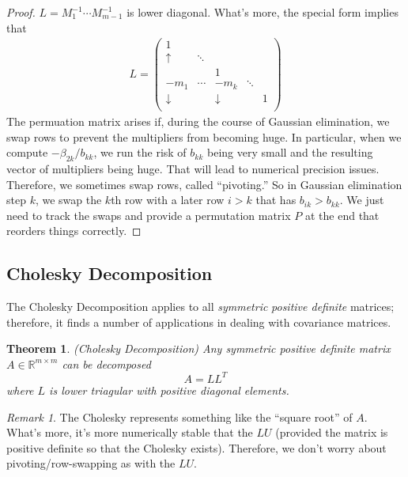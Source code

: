 \documentclass[12pt]{book}
\numberwithin{equation}{section} %
\theoremstyle{plain}
\newtheorem{thm}{Theorem}[section]
\theoremstyle{definition}
\theoremstyle{remark}
\newtheorem*{rmk}{Remark}
\newcommand{\Rmm}{\mathbb{R}^{m\times m}}
\begin{document}
\begin{proof}
$L=M_1^{-1}\cdots M_{m-1}^{-1}$ is lower diagonal. What's more, the
special form implies that
\begin{align*}
  L=
  \begin{pmatrix}
    1 & &\\
    \uparrow& \ddots &\\
     & & 1 \\
    -m_1 & \cdots & -m_k &\ddots \\
    \downarrow & & \downarrow & & 1 \\
  \end{pmatrix}
\end{align*}
The permuation matrix arises if, during the course of Gaussian
elimination, we swap rows to prevent the multipliers from becoming huge.
In particular, when we compute $-\beta_{2k}/b_{kk}$, we run the risk of
$b_{kk}$ being very small and the resulting vector of multipliers being
huge. That will lead to numerical precision issues. Therefore, we
sometimes swap rows, called ``pivoting.'' So in Gaussian elimination
step $k$, we swap the $k$th row with a later row $i>k$ that has
$b_{ik}>b_{kk}$. We just need to track the swaps and provide a
permutation matrix $P$ at the end that reorders things correctly.
\end{proof}


\clearpage
\subsection{Cholesky Decomposition}

The Cholesky Decomposition applies to all \emph{symmetric}
\emph{positive definite} matrices; therefore, it finds a number of
applications in dealing with covariance matrices.

\begin{thm}\emph{(Cholesky Decomposition)}
Any symmetric positive definite matrix $A\in\Rmm$ can be
decomposed
\begin{equation}
  A = L L^T
\end{equation}
where $L$ is lower triagular with positive diagonal elements.
\end{thm}

\begin{rmk}
The Cholesky represents something like the ``square root'' of $A$.
What's more, it's more numerically stable that the $LU$ (provided the
matrix is positive definite so that the Cholesky exists). Therefore, we
don't worry about pivoting/row-swapping as with the $LU$.
\end{rmk}
\end{document}
